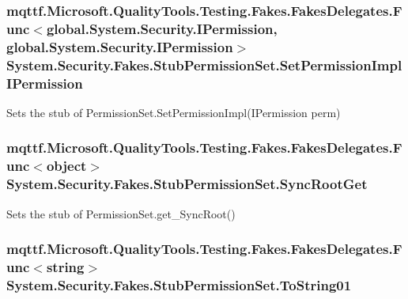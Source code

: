 \hypertarget{class_system_1_1_security_1_1_fakes_1_1_stub_permission_set_ad0d859f30e87a567cdddc37ef58e5220}{
\subsubsection[{Set\-Permission\-Impl\-I\-Permission}]{\setlength{\rightskip}{0pt plus 5cm}mqttf.\-Microsoft.\-Quality\-Tools.\-Testing.\-Fakes.\-Fakes\-Delegates.\-Func$<$global.\-System.\-Security.\-I\-Permission, global.\-System.\-Security.\-I\-Permission$>$ System.\-Security.\-Fakes.\-Stub\-Permission\-Set.\-Set\-Permission\-Impl\-I\-Permission}}\label{class_system_1_1_security_1_1_fakes_1_1_stub_permission_set_ad0d859f30e87a567cdddc37ef58e5220}


Sets the stub of Permission\-Set.\-Set\-Permission\-Impl(\-I\-Permission perm)

\hypertarget{class_system_1_1_security_1_1_fakes_1_1_stub_permission_set_acfaeacee900a85440a6cbeeab3953e4a}{
\subsubsection[{Sync\-Root\-Get}]{\setlength{\rightskip}{0pt plus 5cm}mqttf.\-Microsoft.\-Quality\-Tools.\-Testing.\-Fakes.\-Fakes\-Delegates.\-Func$<$object$>$ System.\-Security.\-Fakes.\-Stub\-Permission\-Set.\-Sync\-Root\-Get}}\label{class_system_1_1_security_1_1_fakes_1_1_stub_permission_set_acfaeacee900a85440a6cbeeab3953e4a}


Sets the stub of Permission\-Set.\-get\-\_\-\-Sync\-Root()

\hypertarget{class_system_1_1_security_1_1_fakes_1_1_stub_permission_set_a5c71d4aed43b6b3a3b78d45d5fee1eaa}{
\subsubsection[{To\-String01}]{\setlength{\rightskip}{0pt plus 5cm}mqttf.\-Microsoft.\-Quality\-Tools.\-Testing.\-Fakes.\-Fakes\-Delegates.\-Func$<$string$>$ System.\-Security.\-Fakes.\-Stub\-Permission\-Set.\-To\-String01}}\label{class_system_1_1_security_1_1_fakes_1_1_stub_permission_set_a5c71d4aed43b6b3a3b78d45d5fee1eaa}


